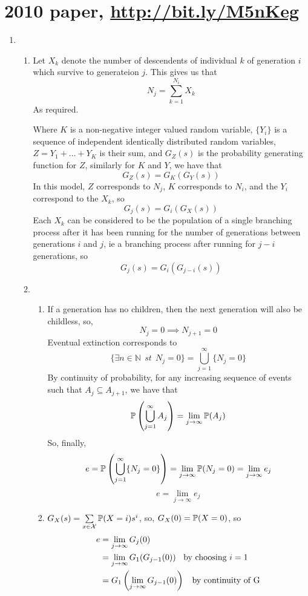 \documentclass{article}
\begin{document}
\section*{2010 paper, \url{http://bit.ly/M5nKeg}}
\begin{enumerate}
\item
\begin{enumerate}
\item
Let $X_k$ denote the number of descendents of individual $k$ of generation $i$ which survive to generateion $j$. This gives us that
$$
N_j = \sum^{N_i}_{k=1}X_k
$$
As required.

Where $K$ is a non-negative integer valued random variable, $\{Y_i\}$ is a
sequence of independent identically distributed random variables,
$Z=Y_1+\dots+Y_K$ is their sum, and $G_Z(s)$ is the probability generating
function for $Z$, similarly for $K$ and $Y$, we have that
$$
G_Z(s) = G_K(G_Y(s))
$$
In this model, $Z$ corresponds to $N_j$, $K$ corresponds to $N_i$, and the $Y_i$ correspond to the $X_k$, so
$$
G_j(s) = G_i(G_X(s))
$$
Each $X_k$ can be considered to be the population of a single branching process after it has been running for the number of generations between generations $i$ and $j$, ie a branching process after running for $j-i$ generations, so
$$
G_j(s) = G_i(G_{j-i}(s))
$$
\item 
\begin{enumerate}
\item
If a generation has no children, then the next generation will also be
childless, so,
$$
N_j=0 \implies N_{j+1}=0
$$
Eventual extinction corresponds to 
$$
\{\exists n \in \mathbb{N} \;\, st \;\, N_j=0\} = \bigcup^\infty_{j=1}\{N_j=0\}
$$
By continuity of probability, for any increasing sequence of events such that
$A_j \subseteq A_{j+1}$, we have that
$$
\mathbb{P}\left(\bigcup^\infty_{j=1}A_j\right) = \lim_{j\rightarrow\infty} \mathbb{P}(A_j)
$$
So, finally,
$$
e=\mathbb{P}\left(\bigcup^\infty_{j=1}\{N_j=0\}\right) = \lim_{j\rightarrow\infty}
\mathbb{P}(N_j=0) = \lim_{j\rightarrow\infty}e_j
$$
$$
e=\lim_{j\rightarrow\infty}e_j
$$
\item
$G_X(s) = \sum\limits_{x \in \mathcal{X}}\mathbb{P}(X=i)s^i$, so, $G_X(0) = \mathbb{P}(X=0)$, so
\begin{align*}
e &= \lim_{j\rightarrow\infty}G_j(0)\\
&= \lim_{j\rightarrow\infty}G_1(G_{j-1}(0)) \mbox{\;\; by choosing $i=1$}\\
&= G_1\left(\lim_{j\rightarrow\infty}G_{j-1}(0)\right)\mbox{\;\; by continuity of G}\\

\end{align*}
\end{enumerate}
\end{enumerate}
\end{enumerate}
\end{document}
